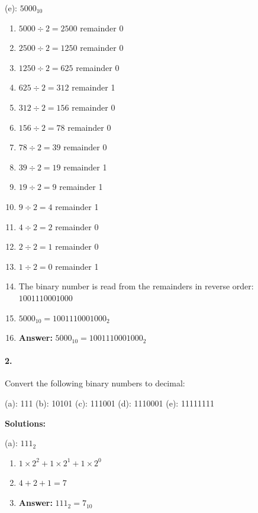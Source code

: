 \documentclass{article}
\begin{document}
\noindent (e): $5000_{10}$

\begin{enumerate}
    \item $5000 \div 2 = 2500$ remainder 0
    \item $2500 \div 2 = 1250$ remainder 0
    \item $1250 \div 2 = 625$ remainder 0
    \item $625 \div 2 = 312$ remainder 1
    \item $312 \div 2 = 156$ remainder 0
    \item $156 \div 2 = 78$ remainder 0
    \item $78 \div 2 = 39$ remainder 0
    \item $39 \div 2 = 19$ remainder 1
    \item $19 \div 2 = 9$ remainder 1
    \item $9 \div 2 = 4$ remainder 1
    \item $4 \div 2 = 2$ remainder 0
    \item $2 \div 2 = 1$ remainder 0
    \item $1 \div 2 = 0$ remainder 1
    \item The binary number is read from the remainders in reverse order: $1001110001000$
    \item $5000_{10} = 1001110001000_2$
    \item \textbf{Answer:} $5000_{10} = 1001110001000_2$
\end{enumerate}

\paragraph*{2.}
Convert the following binary numbers to decimal:

\vspace*{0.25cm}

(a): 111 (b): 10101 (c): 111001 (d): 1110001 (e): 11111111

\vspace*{0.5cm}

\noindent \textbf{Solutions:}

\vspace*{0.25cm}

\noindent (a): $111_2$

\begin{enumerate}
    \item $1 \times 2^2 + 1 \times 2^1 + 1 \times 2^0$
    \item $4 + 2 + 1 = 7$
    \item \textbf{Answer:} $111_2 = 7_{10}$
\end{enumerate}
\end{document}
